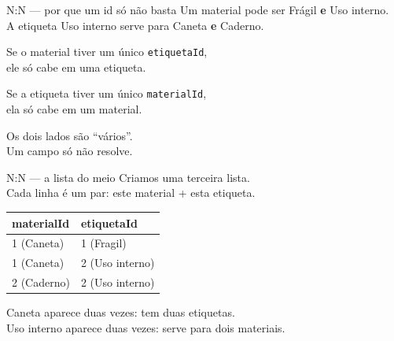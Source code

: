 \documentclass[aspectratio=169,11pt]{beamer}
\begin{document}
\begin{frame}{N{:}N --- por que um id só não basta}
  Um material pode ser Frágil \textbf{e} Uso interno.\\
  A etiqueta Uso interno serve para Caneta \textbf{e} Caderno.

  \vspace{0.5em}
  Se o material tiver um único \texttt{etiquetaId},\\
  ele só cabe em uma etiqueta.

  \vspace{0.5em}
  Se a etiqueta tiver um único \texttt{materialId},\\
  ela só cabe em um material.

  \vspace{0.5em}
  Os dois lados são ``vários''.\\
  Um campo só não resolve.
\end{frame}

\begin{frame}{N{:}N --- a lista do meio}
  Criamos uma terceira lista.\\
  Cada linha é um par: este material + esta etiqueta.

  \vspace{0.4em}
  \begin{center}
  \begin{tabular}{ll}
    \toprule
    materialId & etiquetaId \\
    \midrule
    1 (Caneta) & 1 (Fragil) \\
    1 (Caneta) & 2 (Uso interno) \\
    2 (Caderno) & 2 (Uso interno) \\
    \bottomrule
  \end{tabular}
  \end{center}

  \vspace{0.5em}
  Caneta aparece duas vezes: tem duas etiquetas.\\
  Uso interno aparece duas vezes: serve para dois materiais.
\end{frame}
\end{document}
